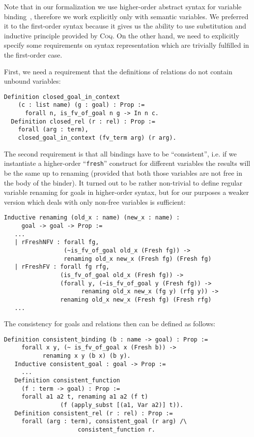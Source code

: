 Note that in our formalization we use higher-order abstract syntax for variable binding~\cite{HOAS}, therefore we work explicitly only with semantic variables.
We preferred it to the first-order syntax because it gives us the ability to use substitution and inductive principle provided by \textsc{Coq}.
On the other hand, we need to explicitly specify some requirements on syntax representation which are trivially fulfilled in the first-order case.

First, we need a requirement that the definitions of relations do not contain unbound variables:

\begin{lstlisting}[language=Coq,basicstyle=\footnotesize]
  Definition closed_goal_in_context 
    (c : list name) (g : goal) : Prop :=
      forall n, is_fv_of_goal n g -> In n c.
  Definition closed_rel (r : rel) : Prop :=
    forall (arg : term),
    closed_goal_in_context (fv_term arg) (r arg).
\end{lstlisting}

The second requirement is that all bindings have to be ``consistent'', i.e. if we instantiate a higher-order ``\lstinline|fresh|''
construct for different variables the results will be the same up to renaming (provided that both those variables are not free in
the body of the binder). It turned out to be rather non-trivial to define regular variable renaming for goals in higher-order syntax, but for our purposes
a weaker version which deals with only non-free variables is sufficient:

\begin{lstlisting}[language=Coq,basicstyle=\footnotesize]
   Inductive renaming (old_x : name) (new_x : name) :
     goal -> goal -> Prop :=
   ...
   | rFreshNFV : forall fg,
                 (~is_fv_of_goal old_x (Fresh fg)) ->
                 renaming old_x new_x (Fresh fg) (Fresh fg)
   | rFreshFV : forall fg rfg,
                (is_fv_of_goal old_x (Fresh fg)) ->
                (forall y, (~is_fv_of_goal y (Fresh fg)) ->
                      renaming old_x new_x (fg y) (rfg y)) ->
                renaming old_x new_x (Fresh fg) (Fresh rfg)
   ...
\end{lstlisting}

The consistency for goals and relations then can be defined as follows:

\begin{lstlisting}[language=Coq,basicstyle=\footnotesize]
   Definition consistent_binding (b : name -> goal) : Prop :=
     forall x y, (~ is_fv_of_goal x (Fresh b)) ->
           renaming x y (b x) (b y).
   Inductive consistent_goal : goal -> Prop :=
     ...
   Definition consistent_function
     (f : term -> goal) : Prop :=
     forall a1 a2 t, renaming a1 a2 (f t)
                (f (apply_subst [(a1, Var a2)] t)).
   Definition consistent_rel (r : rel) : Prop :=
     forall (arg : term), consistent_goal (r arg) /\
                     consistent_function r.
\end{lstlisting}

